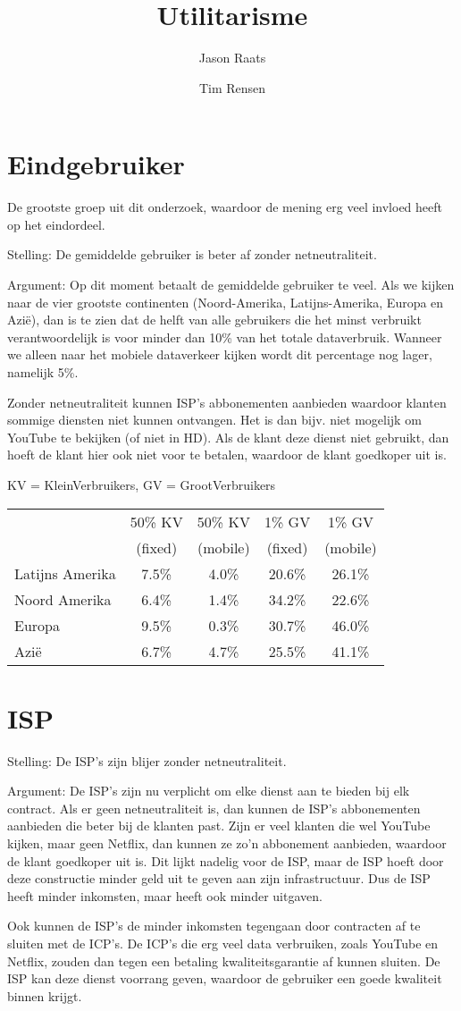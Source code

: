 \documentclass{article}
\title{Utilitarisme}
\author{Jason Raats \and Tim Rensen}
\begin{document}
\maketitle

\section*{Eindgebruiker}
De grootste groep uit dit onderzoek, waardoor de mening erg veel invloed heeft op het eindordeel. 

Stelling: De gemiddelde gebruiker is beter af zonder netneutraliteit.

Argument: Op dit moment betaalt de gemiddelde gebruiker te veel. Als we kijken naar de vier grootste continenten (Noord-Amerika, Latijns-Amerika, Europa en Azi\"e), dan is te zien dat de helft van alle gebruikers die het minst verbruikt verantwoordelijk is voor minder dan 10\% van het totale dataverbruik. Wanneer we alleen naar het mobiele dataverkeer kijken wordt dit percentage nog lager, namelijk 5\%.

Zonder netneutraliteit kunnen ISP's abbonementen aanbieden waardoor klanten sommige diensten niet kunnen ontvangen. Het is dan bijv. niet mogelijk om YouTube te bekijken (of niet in HD). Als de klant deze dienst niet gebruikt, dan hoeft de klant hier ook niet voor te betalen, waardoor de klant goedkoper uit is.

KV = KleinVerbruikers, GV = GrootVerbruikers

\begin{tabular}{ l| c c c c }
& 50\% KV & 50\% KV & 1\% GV & 1\% GV \\
& (fixed) & (mobile) & (fixed) & (mobile) \\
\hline
Latijns Amerika & 7.5\% & 4.0\% & 20.6\% & 26.1\% \\
Noord Amerika & 6.4\% & 1.4\% & 34.2\% & 22.6\%\\
Europa & 9.5\% & 0.3\% & 30.7\% & 46.0\% \\
Azi\"e & 6.7\% & 4.7\% & 25.5\% & 41.1\% \\
\end{tabular} 

\section*{ISP}
Stelling: De ISP's zijn blijer zonder netneutraliteit.

Argument: De ISP's zijn nu verplicht om elke dienst aan te bieden bij elk contract. Als er geen netneutraliteit is, dan kunnen de ISP's abbonementen aanbieden die beter bij de klanten past. Zijn er veel klanten die wel YouTube kijken, maar geen Netflix, dan kunnen ze zo'n abbonement aanbieden, waardoor de klant goedkoper uit is. Dit lijkt nadelig voor de ISP, maar de ISP hoeft door deze constructie minder geld uit te geven aan zijn infrastructuur. Dus de ISP heeft minder inkomsten, maar heeft ook minder uitgaven.

Ook kunnen de ISP's de minder inkomsten tegengaan door contracten af te sluiten met de ICP's. De ICP's die erg veel data verbruiken, zoals YouTube en Netflix, zouden dan tegen een betaling kwaliteitsgarantie af kunnen sluiten. De ISP kan deze dienst voorrang geven, waardoor de gebruiker een goede kwaliteit binnen krijgt.
\end{document}
